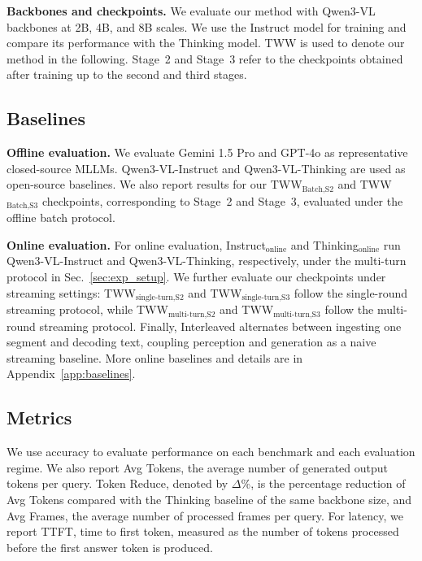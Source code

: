 \documentclass{article}
\begin{document}
\noindent\textbf{Backbones and checkpoints.}
We evaluate our method with Qwen3-VL backbones at 2B, 4B, and 8B scales. We use the Instruct model for training and compare its performance with the Thinking model. TWW is used to denote our method in the following. Stage~2 and Stage~3 refer to the checkpoints obtained after training up to the second and third stages.

\subsection{Baselines}
\label{sec:exp_baselines}

\noindent\textbf{Offline evaluation.}
We evaluate Gemini 1.5 Pro \cite{geminiteam2024gemini15unlockingmultimodal} and GPT-4o \cite{openai2024gpt4ocard} as representative closed-source MLLMs. Qwen3-VL-Instruct and Qwen3-VL-Thinking are used as open-source baselines. We also report results for our TWW$_{\text{Batch,S2}}$ and TWW$_{\text{Batch,S3}}$ checkpoints, corresponding to Stage~2 and Stage~3, evaluated under the offline batch protocol.

\noindent\textbf{Online evaluation.}
For online evaluation, Instruct$_{\text{online}}$ and Thinking$_{\text{online}}$ run Qwen3-VL-Instruct and Qwen3-VL-Thinking, respectively, under the multi-turn protocol in Sec.~\ref{sec:exp_setup}. We further evaluate our checkpoints under streaming settings: TWW$_{\text{single-turn,S2}}$ and TWW$_{\text{single-turn,S3}}$ follow the single-round streaming protocol, while TWW$_{\text{multi-turn,S2}}$ and TWW$_{\text{multi-turn,S3}}$ follow the multi-round streaming protocol. Finally, Interleaved alternates between ingesting one segment and decoding text, coupling perception and generation as a naive streaming baseline. More online baselines and details are in Appendix~\ref{app:baselines}.

\subsection{Metrics}
\label{sec:exp_metrics}

We use accuracy to evaluate performance on each benchmark and each evaluation regime. We also report Avg Tokens, the average number of generated output tokens per query. Token Reduce, denoted by $\Delta$\%, is the percentage reduction of Avg Tokens compared with the Thinking baseline of the same backbone size, and Avg Frames, the average number of processed frames per query. For latency, we report TTFT, time to first token, measured as the number of tokens processed before the first answer token is produced.
\end{document}
